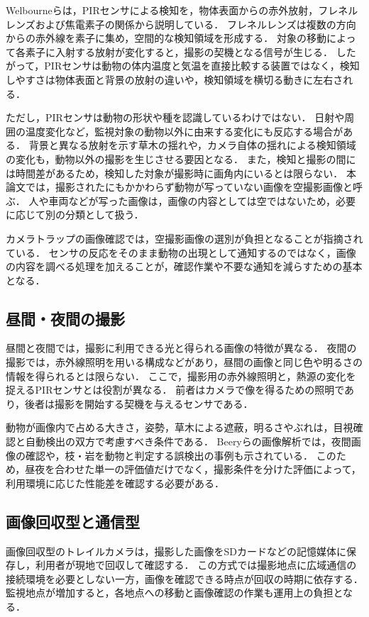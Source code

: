 Welbourneら\cite{Welbourne2016}は，PIRセンサによる検知を，物体表面からの赤外放射，フレネルレンズおよび焦電素子の関係から説明している．
フレネルレンズは複数の方向からの赤外線を素子に集め，空間的な検知領域を形成する．
対象の移動によって各素子に入射する放射が変化すると，撮影の契機となる信号が生じる．
したがって，PIRセンサは動物の体内温度と気温を直接比較する装置ではなく，検知しやすさは物体表面と背景の放射の違いや，検知領域を横切る動きに左右される．

ただし，PIRセンサは動物の形状や種を認識しているわけではない．
日射や周囲の温度変化など，監視対象の動物以外に由来する変化にも反応する場合がある\cite{PanasonicPIR}．
背景と異なる放射を示す草木の揺れや，カメラ自体の揺れによる検知領域の変化も，動物以外の撮影を生じさせる要因となる\cite{Welbourne2016}．
また，検知と撮影の間には時間差があるため，検知した対象が撮影時に画角内にいるとは限らない．
本論文では，撮影されたにもかかわらず動物が写っていない画像を空撮影画像と呼ぶ．
人や車両などが写った画像は，画像の内容としては空ではないため，必要に応じて別の分類として扱う．

カメラトラップの画像確認では，空撮影画像の選別が負担となることが指摘されている\cite{Beery2019}．
センサの反応をそのまま動物の出現として通知するのではなく，画像の内容を調べる処理を加えることが，確認作業や不要な通知を減らすための基本となる．

\subsection{昼間・夜間の撮影}
昼間と夜間では，撮影に利用できる光と得られる画像の特徴が異なる．
夜間の撮影では，赤外線照明を用いる構成などがあり，昼間の画像と同じ色や明るさの情報を得られるとは限らない．
ここで，撮影用の赤外線照明と，熱源の変化を捉えるPIRセンサとは役割が異なる．
前者はカメラで像を得るための照明であり，後者は撮影を開始する契機を与えるセンサである．

動物が画像内で占める大きさ，姿勢，草木による遮蔽，明るさやぶれは，目視確認と自動検出の双方で考慮すべき条件である．
Beeryらの画像解析では，夜間画像の確認や，枝・岩を動物と判定する誤検出の事例も示されている\cite{Beery2019}．
このため，昼夜を合わせた単一の評価値だけでなく，撮影条件を分けた評価によって，利用環境に応じた性能差を確認する必要がある．

\subsection{画像回収型と通信型}
画像回収型のトレイルカメラは，撮影した画像をSDカードなどの記憶媒体に保存し，利用者が現地で回収して確認する．
この方式では撮影地点に広域通信の接続環境を必要としない一方，画像を確認できる時点が回収の時期に依存する．
監視地点が増加すると，各地点への移動と画像確認の作業も運用上の負担となる．


